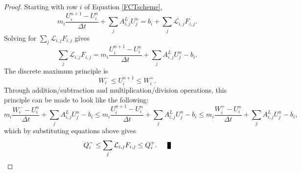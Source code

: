 \begin{proof}
   Starting with row $i$ of Equation \eqref{FCTscheme},
   \[
      m_i\frac{U_i^{n+1}-U_i^n}{\Delta t}
      + \sum\limits_j A_{i,j}^L U_j^n
      = b_i + \sum\limits_j\mathcal{L}_{i,j}F_{i,j}.
   \]
   Solving for $\sum\limits_j\mathcal{L}_{i,j}F_{i,j}$ gives
   \[
      \sum\limits_j\mathcal{L}_{i,j}F_{i,j} =
      m_i\frac{U_i^{n+1}-U_i^n}{\Delta t}
      + \sum\limits_j A_{i,j}^L U_j^n
      - b_i.
   \]
   The discrete maximum principle is
   \[
      W_i^-\le U_i^{n+1}\le W_i^+.
   \]
   Through addition/subtraction and multiplication/division operations, this
   principle can be made to look like the following:
   \[
   m_i\frac{W_i^- -U_i^n}{\Delta t}
      + \sum\limits_j A_{i,j}^L U_j^n
      - b_i
   \le m_i\frac{U_i^{n+1}-U_i^n}{\Delta t}
      + \sum\limits_j A_{i,j}^L U_j^n
      - b_i
   \le m_i\frac{W_i^+ -U_i^n}{\Delta t}
      + \sum\limits_j A_{i,j}^L U_j^n
      - b_i,
   \]
   which by substituting equations above gives
   \[
      Q_i^-\le\sum\limits_j \mathcal{L}_{i,j}F_{i,j}\le Q_i^+.\qed
   \]
\end{proof}
%
